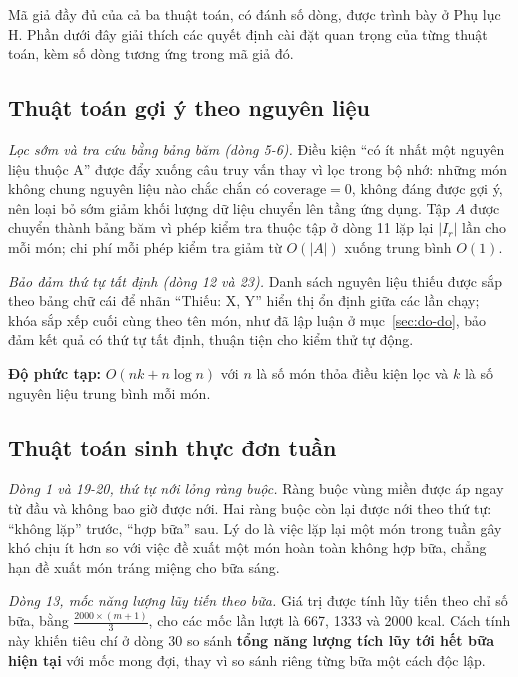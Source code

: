 Mã giả đầy đủ của cả ba thuật toán, có đánh số dòng, được trình bày ở Phụ lục H.
Phần dưới đây giải thích các quyết định cài đặt quan trọng của từng thuật toán,
kèm số dòng tương ứng trong mã giả đó.

\subsection{Thuật toán gợi ý theo nguyên liệu}
\label{sec:thuat-toan-goi-y}

\textit{Lọc sớm và tra cứu bằng bảng băm (dòng 5-6).} Điều kiện ``có ít nhất một
nguyên liệu thuộc A'' được đẩy xuống câu truy vấn thay vì lọc trong bộ nhớ:
những món không chung nguyên liệu nào chắc chắn có $\mathrm{coverage} = 0$,
không đáng được gợi ý, nên loại bỏ sớm giảm khối lượng dữ liệu chuyển lên tầng
ứng dụng. Tập $A$ được chuyển thành bảng băm vì phép kiểm tra thuộc tập ở dòng
11 lặp lại $|I_r|$ lần cho mỗi món; chi phí mỗi phép kiểm tra giảm từ $O(|A|)$
xuống trung bình $O(1)$.

\textit{Bảo đảm thứ tự tất định (dòng 12 và 23).} Danh sách nguyên liệu thiếu
được sắp theo bảng chữ cái để nhãn ``Thiếu: X, Y'' hiển thị ổn định giữa các lần
chạy; khóa sắp xếp cuối cùng theo tên món, như đã lập luận ở
mục~\ref{sec:do-do}, bảo đảm kết quả có thứ tự tất định, thuận tiện cho kiểm thử
tự động.

\noindent\textbf{Độ phức tạp:} $O(nk + n\log n)$ với $n$ là số món thỏa điều kiện
lọc và $k$ là số nguyên liệu trung bình mỗi món.

\subsection{Thuật toán sinh thực đơn tuần}
\label{sec:thuat-toan-thuc-don}

\textit{Dòng 1 và 19-20, thứ tự nới lỏng ràng buộc.} Ràng buộc vùng miền được áp
ngay từ đầu và không bao giờ được nới. Hai ràng buộc còn lại được nới theo thứ
tự: ``không lặp'' trước, ``hợp bữa'' sau. Lý do là việc lặp lại một món trong
tuần gây khó chịu ít hơn so với việc đề xuất một món hoàn toàn không hợp bữa,
chẳng hạn đề xuất món tráng miệng cho bữa sáng.

\textit{Dòng 13, mốc năng lượng lũy tiến theo bữa.} Giá trị 
được tính lũy tiến theo chỉ số bữa, bằng $\frac{2000 \times (m+1)}{3}$, cho các
mốc lần lượt là 667, 1333 và 2000 kcal. Cách tính này khiến tiêu chí ở dòng 30 so
sánh \textbf{tổng năng lượng tích lũy tới hết bữa hiện tại} với mốc mong đợi,
thay vì so sánh riêng từng bữa một cách độc lập.

